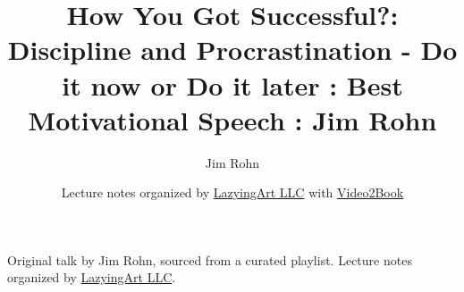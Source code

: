 \documentclass[11pt,oneside]{book}
\begin{document}
\frontmatter
\title{How You Got Successful?: Discipline and Procrastination - Do it now or Do it later : Best Motivational Speech : Jim Rohn}
\author{Jim Rohn}
\date{Lecture notes organized by \href{https://lazying.art}{LazyingArt LLC} with \href{https://github.com/lachlanchen/Video2Book}{Video2Book}}
\maketitle
\begin{center}
\small Original talk by Jim Rohn, sourced from a curated playlist. Lecture notes organized by \href{https://lazying.art}{LazyingArt LLC}.
\end{center}
\clearpage
\mainmatter

\end{document}
